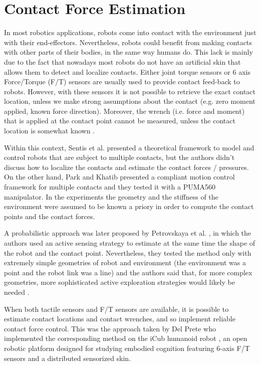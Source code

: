 \section{Contact Force Estimation}
	\label{sec:contact_estimation}
	
	In most robotics applications, robots come into contact with the environment just with
	their end-effectors.
	Nevertheless, robots could benefit from making contacts with other parts of their bodies,
	in the same way humans do.
	This lack is mainly due to the fact that nowadays most robots do not have an artificial skin
	that allows them to detect and localize contacts.
	Either joint torque sensors or 6 axis Force/Torque (F/T) sensors are usually used to provide
	contact	feed-back to robots.
	However, with these sensors it is not possible to retrieve the exact contact location,
	unless we make strong assumptions about the contact
	(e.g. zero moment applied, known force direction).
	Moreover, the wrench (i.e. force and moment) that is applied at the contact point cannot be
	measured, unless the contact location is somewhat known \cite{DelPrete_PhDThesis2013}.
	
	Within this context, Sentis et al. \cite{Sentis_IROS2009} presented a theoretical framework
	to model and control robots that are subject to multiple contacts, but the authors didn't
	discuss how to localize the contacts and estimate the	contact forces / pressures.
	On the other hand, Park and Khatib \cite{Park_ICRA2005} presented a compliant motion control
	framework for multiple contacts and they tested it with a PUMA560 manipulator.
	In the experiments the geometry and the stiffness of the environment were assumed to be known
	a priory in order to compute the contact points and the contact forces.
	
	A probabilistic approach was later proposed by Petrovskaya et al. \cite{Petrovskaya_ICRA2007},
	in which the authors used	an active sensing strategy to estimate at the same time the shape of
	the robot and the contact point.
	Nevertheless, they tested the method only with extremely simple geometries of robot and
	environment (the environment was a point and the robot link was a line) and the authors said
	that,	for more complex geometries, more sophisticated active exploration strategies would likely
	be needed \cite{DelPrete_PhDThesis2013}.
	
	When both tactile sensors and F/T sensors are available, it is possible to estimate contact
	locations and	contact wrenches, and so implement reliable contact force control.
	This was the approach taken by Del Prete \cite{DelPrete_PhDThesis2013} who implemented the
	corresponding method on the iCub humanoid	robot \cite{Metta_PerMIS2008}, an open robotic
	platform designed for studying embodied cognition featuring 6-axis F/T sensors and a distributed
	sensorized skin.